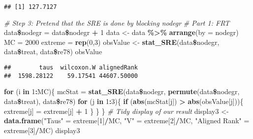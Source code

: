 \documentclass[]{article}
\newenvironment{Shaded}{\begin{snugshade}}{\end{snugshade}}
\newcommand{\KeywordTok}[1]{\textcolor[rgb]{0.13,0.29,0.53}{\textbf{#1}}}
\newcommand{\DataTypeTok}[1]{\textcolor[rgb]{0.13,0.29,0.53}{#1}}
\newcommand{\DecValTok}[1]{\textcolor[rgb]{0.00,0.00,0.81}{#1}}
\newcommand{\StringTok}[1]{\textcolor[rgb]{0.31,0.60,0.02}{#1}}
\newcommand{\CommentTok}[1]{\textcolor[rgb]{0.56,0.35,0.01}{\textit{#1}}}
\newcommand{\ControlFlowTok}[1]{\textcolor[rgb]{0.13,0.29,0.53}{\textbf{#1}}}
\newcommand{\OperatorTok}[1]{\textcolor[rgb]{0.81,0.36,0.00}{\textbf{#1}}}
\newcommand{\NormalTok}[1]{#1}
\begin{document}
\begin{verbatim}
## [1] 127.7127
\end{verbatim}

\begin{Shaded}
\begin{Highlighting}[]
\CommentTok{# Step 3: Pretend that the SRE is done by blocking nodegr}
\CommentTok{# Part 1: FRT}
\NormalTok{data}\OperatorTok{\$}\NormalTok{nodegr =}\StringTok{ }\NormalTok{data}\OperatorTok{\$}\NormalTok{nodegr }\OperatorTok{+}\StringTok{ }\DecValTok{1}
\NormalTok{data <-}\StringTok{ }\NormalTok{data }\OperatorTok{\%>\%}\StringTok{ }\KeywordTok{arrange}\NormalTok{(}\DataTypeTok{by =}\NormalTok{ nodegr)}
\NormalTok{MC =}\StringTok{ }\DecValTok{2000}
\NormalTok{extreme =}\StringTok{ }\KeywordTok{rep}\NormalTok{(}\DecValTok{0}\NormalTok{,}\DecValTok{3}\NormalTok{)}
\NormalTok{obsValue <-}\StringTok{ }\KeywordTok{stat_SRE}\NormalTok{(data}\OperatorTok{\$}\NormalTok{nodegr, data}\OperatorTok{\$}\NormalTok{treat, data}\OperatorTok{\$}\NormalTok{re78)}
\NormalTok{obsValue}
\end{Highlighting}
\end{Shaded}

\begin{verbatim}
##        taus  wilcoxon.W alignedRank 
##  1598.28122    59.17541 44607.50000
\end{verbatim}

\begin{Shaded}
\begin{Highlighting}[]
\ControlFlowTok{for}\NormalTok{ (i }\ControlFlowTok{in} \DecValTok{1}\OperatorTok{:}\NormalTok{MC)\{}
\NormalTok{  mcStat =}\StringTok{ }\KeywordTok{stat_SRE}\NormalTok{(data}\OperatorTok{\$}\NormalTok{nodegr, }\KeywordTok{permute}\NormalTok{(data}\OperatorTok{\$}\NormalTok{nodegr, data}\OperatorTok{\$}\NormalTok{treat), data}\OperatorTok{\$}\NormalTok{re78)}
  \ControlFlowTok{for}\NormalTok{ (j }\ControlFlowTok{in} \DecValTok{1}\OperatorTok{:}\DecValTok{3}\NormalTok{)\{}
    \ControlFlowTok{if}\NormalTok{ (}\KeywordTok{abs}\NormalTok{(mcStat[j]) }\OperatorTok{>}\StringTok{ }\KeywordTok{abs}\NormalTok{(obsValue[j]))\{}
\NormalTok{      extreme[j] =}\StringTok{ }\NormalTok{extreme[j] }\OperatorTok{+}\StringTok{ }\DecValTok{1}
\NormalTok{    \}}
\NormalTok{  \}}
\NormalTok{\}}
\CommentTok{# Tidy display of our result}
\NormalTok{display3 <-}\StringTok{ }\KeywordTok{data.frame}\NormalTok{(}\StringTok{"Taus"}\NormalTok{ =}\StringTok{ }\NormalTok{extreme[}\DecValTok{1}\NormalTok{]}\OperatorTok{/}\NormalTok{MC, }\StringTok{"V"}\NormalTok{ =}\StringTok{ }\NormalTok{extreme[}\DecValTok{2}\NormalTok{]}\OperatorTok{/}\NormalTok{MC, }\StringTok{"Aligned Rank"}\NormalTok{ =}\StringTok{ }\NormalTok{extreme[}\DecValTok{3}\NormalTok{]}\OperatorTok{/}\NormalTok{MC)}
\NormalTok{display3}
\end{Highlighting}
\end{Shaded}
\end{document}
